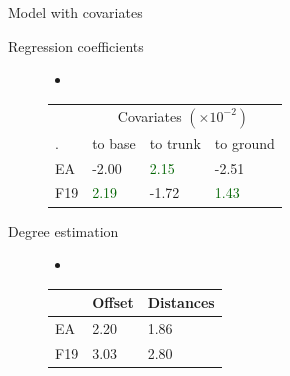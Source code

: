 \documentclass[aspectratio=169]{beamer}
\newcommand{\pos}[1]{\textcolor{Darkgreen}{#1}}
\newcommand{\nega}[1]{\textcolor{Nicered}{#1}}
\begin{document}
\begin{frame}{Model with covariates}
	\begin{description}
	\item[Regression coefficients]\begin{itemize}
	\item []
\end{itemize}%

\begin{table}[]
\begin{tabular}{l|lll}
  & \multicolumn{3}{|c}{Covariates $(\times 10^{-2})$}   \\\cline{2-4}
   .  & to base & to trunk & to ground \\\hline
EA  &  \nega{-2.00} &\pos{ 2.15  } &  \nega{-2.51  } \\
F19 & \pos{2.19 } &  \nega{-1.72}  & \pos{1.43  } 
\end{tabular}
\end{table}

	\item[Degree estimation]\begin{itemize}
	\item []
\end{itemize} \begin{table}[]
\begin{tabular}{l|ll}
    & Offset & Distances \\\hline
EA  & 2.20   & 1.86      \\
F19 & 3.03   & 2.80     
\end{tabular}
\end{table}
\end{description}
\end{frame}
\end{document}
